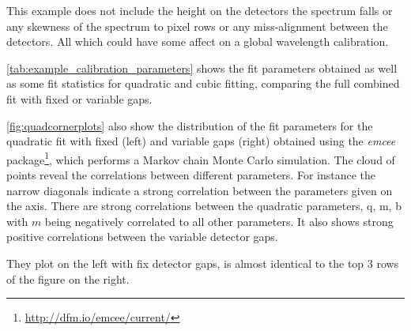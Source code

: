 This example does not include the height on the detectors the spectrum falls or any skewness of the spectrum to pixel rows or any miss-alignment between the detectors.
All which could have some affect on a global wavelength calibration.

\cref{tab:example_calibration_parameters} shows the fit parameters obtained as well as some fit statistics for quadratic and cubic fitting, comparing the full combined fit with fixed or variable gaps.

\cref{fig:quadcornerplots} also show the distribution of the fit parameters for the quadratic fit with fixed (left) and variable gaps (right) obtained using the \textit{emcee} \Python{} package\footnote{\href{http://dfm.io/emcee/current/}{http://dfm.io/emcee/current/}}, which performs a Markov chain Monte Carlo simulation.
The cloud of points reveal the correlations between different parameters.
For instance the narrow diagonals indicate a strong correlation between the parameters given on the axis.
There are strong correlations between the quadratic parameters, {q, m, b} with $m$ being negatively correlated to all other parameters.
It also shows strong positive correlations between the variable detector gaps.

They plot on the left with fix detector gaps, is almost identical to the top 3 rows of the figure on the right.




